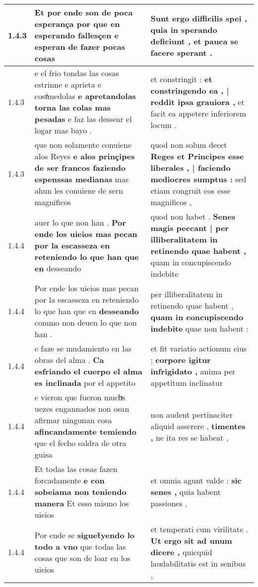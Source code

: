 \begin{tabular}{|p{1cm}|p{6.5cm}|p{6.5cm}|}
1.4.3 & Et por ende son de poca esperança \textbf{ por que en esperando fallesçen } e esperan de fazer pocas cosas & Sunt ergo difficilis spei , \textbf{ quia in sperando deficiunt , } et pauca se facere sperant . \\\hline
1.4.3 & e el frio tondas las cosas estrinne e aprieta e costͥmedolas \textbf{ e apretandolas torna las colas mas pesadas } e faz las dessear el logar mas bayo . & et constringit : \textbf{ et constringendo ea , | reddit ipsa grauiora , } et facit ea appetere inferiorem locum . \\\hline
1.4.3 & que non solamente conuiene alos Reyes \textbf{ e alos prinçipes de ser francos faziendo espenssas medianas } mas ahun les conuiene de sern magnificos & quod non solum decet \textbf{ Reges et Principes esse liberales , | faciendo mediocres sumptus : } sed etiam congruit eos esse magnificos , \\\hline
1.4.4 & auer lo que non han . \textbf{ Por ende los uieios mas pecan por la escasseza en reteniendo lo que han que en } desseando & quod non habet . \textbf{ Senes magis peccant | per illiberalitatem in retinendo quae habent , } quam in concupiscendo indebite \\\hline
1.4.4 & Por ende los uieios mas pecan por la escasseza en reteniendo lo que han que en \textbf{ desseando } commo non deuen lo que non han . & per illiberalitatem in retinendo quae habent , \textbf{ quam in concupiscendo indebite } quae non habent : \\\hline
1.4.4 & e faze se mudamiento en las obras del alma . \textbf{ Ca esfriando el cuerpo el alma es inclinada } por el appetito & et fit variatio actionum eius ; \textbf{ corpore igitur infrigidato , } anima per appetitum inclinatur \\\hline
1.4.4 & e vieron que fueron muchͣs uezes engannados non osan afirmar ningunan cosa \textbf{ afincandamente temiendo } que el fecho saldra de otra guisa & non audent pertinaciter aliquid asserere , \textbf{ timentes , } ne ita res se habeat , \\\hline
1.4.4 & Et todas las cosas fazen forcadamente \textbf{ e con sobeiama non teniendo manera } Et esso mismo los uieios & et omnia agunt valde : \textbf{ sic senes , } quia habent passiones , \\\hline
1.4.4 & Por ende se \textbf{ siguet̃yendo lo todo a vno } que todas las cosas que son de loar en los uieios & et temperati cum virilitate . \textbf{ Ut ergo sit ad unum dicere , } quicquid laudabilitatis est in senibus , \\\hline

\end{tabular}
